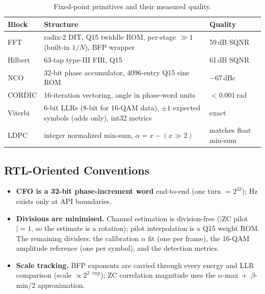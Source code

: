 \begin{table}[H]
    \centering
    \caption{Fixed-point primitives and their measured quality.}
    \label{tab:fixed_prims}
    \small
    \begin{tabular}{@{}lp{7.2cm}l@{}}
    \toprule
    \textbf{Block} & \textbf{Structure} & \textbf{Quality} \\
    \midrule
    FFT     & radix-2 DIT, Q15 twiddle ROM, per-stage $\gg 1$
              (built-in $1/N$), BFP wrapper & 59\,dB SQNR \\
    Hilbert & 63-tap type-III FIR, Q15 & 61\,dB SQNR \\
    NCO     & 32-bit phase accumulator, 4096-entry Q15 sine ROM &
              $-67$\,dBc \\
    CORDIC  & 16-iteration vectoring, angle in phase-word units &
              $<0.001$\,rad \\
    Viterbi & 6-bit LLRs (8-bit for 16-QAM data), $\pm 1$ expected
              symbols (adds only), int32 metrics & exact \\
    LDPC    & integer normalized min-sum,
              $\alpha = x - (x \!\gg\! 2)$ & matches float min-sum \\
    \bottomrule
    \end{tabular}
\end{table}

\subsection{RTL-Oriented Conventions}

\begin{itemize}
    \item \textbf{CFO is a 32-bit phase-increment word} end-to-end (one
          turn $= 2^{32}$); Hz exists only at API boundaries.
    \item \textbf{Divisions are minimised.}  Channel estimation is
          division-free ($|$ZC pilot$| = 1$, so the estimate is a
          rotation); pilot interpolation is a Q15 weight ROM.  The
          remaining dividers: the calibration $\alpha$ fit (one per
          frame), the 16-QAM amplitude reference (one per symbol), and
          the detection metrics.
    \item \textbf{Scale tracking.}  BFP exponents are carried through
          every energy and LLR comparison (scale
          $\propto 2^{2\cdot\mathrm{exp}}$); ZC correlation magnitude
          uses the $\alpha$-max~+~$\beta$-min/2 approximation.
\end{itemize}

